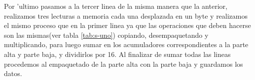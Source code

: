 Por 'ultimo pasamos a la tercer linea de la misma manera que la anterior, realizamos tres lecturas a memoria
cada una desplazada en un byte y realizamos el mismo proceso que en la primer linea ya que 
las operaciones que deben hacerse son las mismas(ver tabla \ref{tab:s-uno}) copiando, desempaquetando 
y multiplicando, para luego sumar en los acumuladores correspondientes a la parte alta y parte baja, y dividirlos por 16.
Al finalizar de sumar todas las lineas procedemos al empaquetado de la parte alta con la parte baja y 
guardamos los datos.



